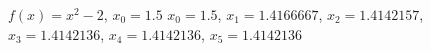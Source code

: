 {$f(x) = x^2-2$, $x_0=1.5$
}
{$x_0=1.5$, $x_1=1.4166667$, $x_2=1.4142157$, $x_3=1.4142136$, $x_4=1.4142136$, $x_5=1.4142136$
}
